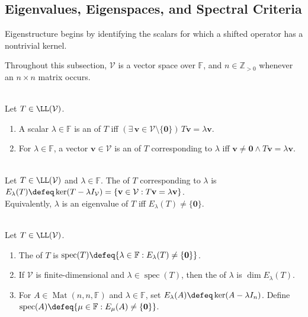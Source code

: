 \subsection{Eigenvalues, Eigenspaces, and Spectral Criteria}

Eigenstructure begins by identifying the scalars for which a shifted operator has a nontrivial kernel.

Throughout this subsection, $\mathcal{V}$ is a vector space over $\mathbb{F}$, and $n\in\mathbb{Z}_{>0}$ whenever an $n\times n$ matrix occurs.

\begin{definition} \label{def:eigenvalue-eigenvector} \\
Let $T\in\LL(\mathcal{V})$.
\begin{enumerate}[label=(\roman*)]
\setlength{\itemsep}{0pt}
\item A scalar $\lambda\in\mathbb{F}$ is an  of $T$ iff $(\exists\,\mathbf{v}\in\mathcal{V}\setminus\{\mathbf{0}\})\,T\mathbf{v}=\lambda\mathbf{v}$.
\item For $\lambda\in\mathbb{F}$, a vector $\mathbf{v}\in\mathcal{V}$ is an  of $T$ corresponding to $\lambda$ iff $\mathbf{v}\neq\mathbf{0}\land T\mathbf{v}=\lambda\mathbf{v}$.
\end{enumerate}
\end{definition}

\begin{definition} \label{def:eigenspace} \\
Let $T\in\LL(\mathcal{V})$ and $\lambda\in\mathbb{F}$. The  of $T$ corresponding to $\lambda$ is $E_{\lambda}(T)\defeq\ker(T-\lambda I_{\mathcal{V}})=\{\mathbf{v}\in\mathcal{V}:T\mathbf{v}=\lambda\mathbf{v}\}$.\\
Equivalently, $\lambda$ is an eigenvalue of $T$ iff $E_{\lambda}(T)\neq\{\mathbf{0}\}$.
\end{definition}

\begin{definition} \label{def:spectrum-and-geometric-multiplicity} \\
Let $T\in\LL(\mathcal{V})$.
\begin{enumerate}[label=(\roman*)]
\setlength{\itemsep}{0pt}
\item The  of $T$ is $\operatorname{spec}(T)\defeq\{\lambda\in\mathbb{F}:E_{\lambda}(T)\neq\{\mathbf{0}\}\}$.
\item If $\mathcal{V}$ is finite-dimensional and $\lambda\in\operatorname{spec}(T)$, then the  of $\lambda$ is $\dim E_{\lambda}(T)$.
\item For $A\in\operatorname{Mat}(n,n,\mathbb{F})$ and $\lambda\in\mathbb{F}$, set $E_{\lambda}(A)\defeq\ker(A-\lambda I_n)$. Define $\operatorname{spec}(A)\defeq\{\mu\in\mathbb{F}:E_{\mu}(A)\neq\{\mathbf{0}\}\}$.
\end{enumerate}
\end{definition}

